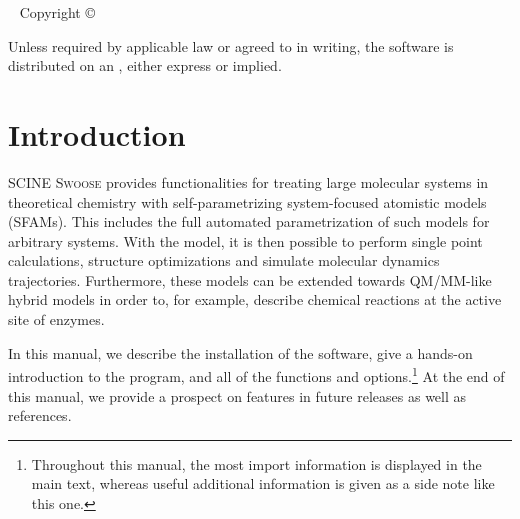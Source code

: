 \documentclass[]{tufte-book}
\title[SCINE Swoose manual]{User Manual \vskip 0.5em {\setlength{\parindent}{0pt} \Huge SCINE Swoose 3.0.0}}
\author[The SCINE Swoose Developers]{\noindent Moritz Bensberg, Christoph Brunken, Katja-Sophia Csizi, Miguel Steiner, Thomas Weymuth, and Markus Reiher}
\newcommand{\monthyear}{%
  \ifcase\month\or January\or February\or March\or April\or May\or June\or
  July\or August\or September\or October\or November\or
  December\fi\space\number\year
}
\begin{document}
\setlength{\parindent}{0pt}

\frontmatter


\maketitle

\newpage
\begin{fullwidth}
~\vfill
\thispagestyle{empty}
\setlength{\parindent}{0pt}
\setlength{\parskip}{\baselineskip}
Copyright \copyright\ \the\year\ \thanklessauthor


\par Unless required by applicable law or agreed to in writing, the software
is distributed on an , either express or implied. 

\end{fullwidth}

\tableofcontents




\mainmatter

\let\cleardoublepage\clearpage
\chapter{Introduction}\label{ch:introduction}

SCINE \textsc{Swoose} provides functionalities for treating large molecular systems in theoretical chemistry with self-parametrizing system-focused atomistic models (SFAMs).\cite{brunken20} This includes the full automated parametrization of such models for arbitrary systems. With the model, it is then possible to perform single point calculations, structure optimizations and simulate molecular dynamics trajectories. Furthermore, these models can be extended towards QM/MM-like hybrid models in order to, for example, describe chemical reactions at the active site of enzymes.

In this manual, we describe the installation of the software, give a hands-on introduction to the program, and all of the functions and options.\footnote{Throughout this manual, the most
import information is displayed in the main text, whereas useful additional information is given as a side note like this one.}
At the end of this manual, we provide a prospect on features in future releases as well as references.
\end{document}
